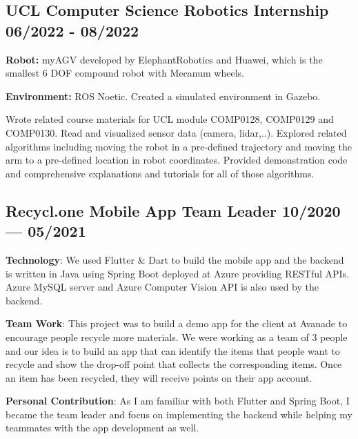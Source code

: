 \subsection*{{
    UCL Computer Science Robotics Internship
    \hfill 06/2022 - 08/2022
}}
\begin{zitemize}
    \item   \textbf{Robot:} myAGV developed by ElephantRobotics and Huawei,
            which is the smallest 6 DOF compound robot with Mecanum wheels.
    \item   \textbf{Environment:} ROS Noetic. Created a simulated environment in Gazebo.
    \item   Wrote related course materials for UCL module COMP0128, COMP0129 and COMP0130.
            Read and visualized sensor data (camera, lidar,..). Explored related
            algorithms including moving the robot in a pre-defined trajectory and
            moving the arm to a pre-defined location in robot coordinates.
            Provided demonstration code and comprehensive explanations and tutorials for all of those algorithms.
\end{zitemize}

\subsection{{Recycl.one Mobile App Team Leader
    \hfill 10/2020 --- 05/2021}}
\begin{zitemize}
    \item \textbf{Technology}: We used Flutter \& Dart to build the mobile app and
        the backend is written in Java using Spring Boot deployed at Azure 
        providing RESTful APIs.
        Azure MySQL server and Azure Computer Vision API is also used by the 
        backend.
    \item \textbf{Team Work}: This project was to build a demo app for the client
        at Avanade to encourage people recycle more materials. We were working
        as a team of 3 people and our idea is to build an app that can identify
        the items that people want to recycle and show the drop-off point that 
        collects the corresponding items. Once an item has been recycled, they 
        will receive points on their app account.
    \item \textbf{Personal Contribution}: As I am familiar with both Flutter and
        Spring Boot, I became the team leader and focus on implementing the 
        backend while helping my teammates with the app development as well. 
\end{zitemize}


